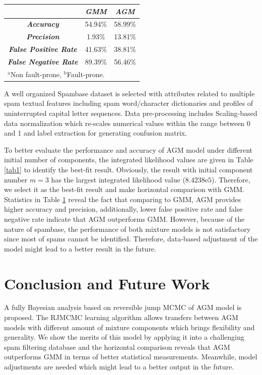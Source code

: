 \documentclass[conference]{IEEEtran}
\begin{document}
\begin{table}[b]
\begin{center}
\begin{tabular}{|c|c|c|}
\hline
 & \multicolumn{1}{|p{1.5cm}|}{\centering \textbf{\textit{GMM}}} & \multicolumn{1}{|p{1.5cm}|}{\centering \textbf{\textit{AGM}}}\\
\hline
\multicolumn{1}{|p{2.5cm}|}{\centering \textbf{\textit{Accuracy}}}  & 54.94\% & 58.99\%\\
\multicolumn{1}{|p{2.5cm}|}{\centering \textbf{\textit{Precision}}} & 1.93\% & 13.81\%\\
\multicolumn{1}{|p{2.5cm}|}{\centering \textbf{\textit{False Positive Rate}}}  & 41.63\% & 38.81\%\\
\multicolumn{1}{|p{2.5cm}|}{\centering \textbf{\textit{False Negative Rate}}} & 89.39\% & 56.46\%\\
\hline
\multicolumn{3}{l}{$^{\mathrm{a}}$Non fault-prone, $^{\mathrm{b}}$Fault-prone.}
\end{tabular}
\end{center}
\label{tab2}
\end{table}

A well organized Spambase dataset\cite{Hopkins2018} is selected with attributes related to multiple spam textual features including spam word/character dictionaries and profiles of uninterrupted capital letter sequences. Data pre-processing includes Scaling-based data normalization which re-scales numerical values within the range between 0 and 1 and label extraction for generating confusion matrix. 

To better evaluate the performance and accuracy of AGM model under different initial number of components, the integrated likelihood\cite{Bouguila2009} values are given in Table \ref{tab1} to identify the best-fit result. Obviously, the result with initial component number $m=3$ has the largest integrated likelihood value ($8.4238\mathrm{e}{5}$). Therefore, we select it as the best-fit result and make horizontal comparison with GMM. Statistics in Table \ref{tab2} reveal the fact that comparing to GMM, AGM provides higher accuracy and precision, additionally, lower false positive rate and false negative rate indicate that AGM outperforms GMM. However, because of the nature of spambase, the performance of both mixture models is not satisfactory since most of spams cannot be identified. Therefore, data-based adjustment of the model might lead to a better result in the future. 

\section{Conclusion and Future Work}
A fully Bayesian analysis based on reversible jump MCMC of AGM model is proposed. The RJMCMC learning algorithm allows transfers between AGM models with different amount of mixture components which brings flexibility and generality. We show the merits of this model by applying it into a challenging spam filtering database and the horizontal comparison reveals that AGM outperforms GMM in terms of better statistical measurements. Meanwhile, model adjustments are needed which might lead to a better output in the future.


 
\end{document}
